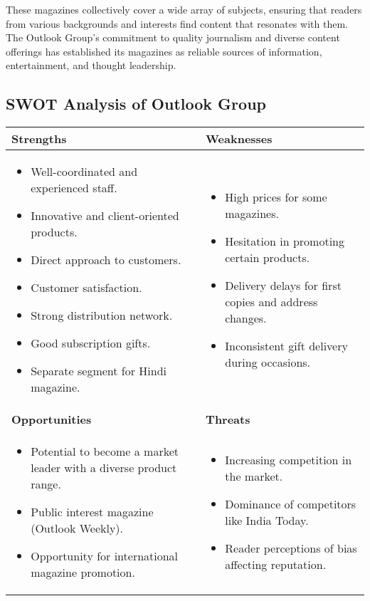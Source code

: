 These magazines collectively cover a wide array of subjects, ensuring that readers from various backgrounds and interests find content that resonates with them. The Outlook Group's commitment to quality journalism and diverse content offerings has established its magazines as reliable sources of information, entertainment, and thought leadership.

\subsection{SWOT Analysis of Outlook Group}

\begin{tabularx}{\textwidth}{|X|X|}
\hline
\textbf{Strengths} & \textbf{Weaknesses} \\
\hline
\begin{itemize}
\item Well-coordinated and experienced staff.
\item Innovative and client-oriented products.
\item Direct approach to customers.
\item Customer satisfaction.
\item Strong distribution network.
\item Good subscription gifts.
\item Separate segment for Hindi magazine.
\end{itemize}
&
\begin{itemize}
\item High prices for some magazines.
\item Hesitation in promoting certain products.
\item Delivery delays for first copies and address changes.
\item Inconsistent gift delivery during occasions.
\end{itemize}
\\
\hline
\textbf{Opportunities} & \textbf{Threats} \\
\hline
\begin{itemize}
\item Potential to become a market leader with a diverse product range.
\item Public interest magazine (Outlook Weekly).
\item Opportunity for international magazine promotion.
\end{itemize}
&
\begin{itemize}
\item Increasing competition in the market.
\item Dominance of competitors like India Today.
\item Reader perceptions of bias affecting reputation.
\end{itemize}
\\
\hline
\end{tabularx}

